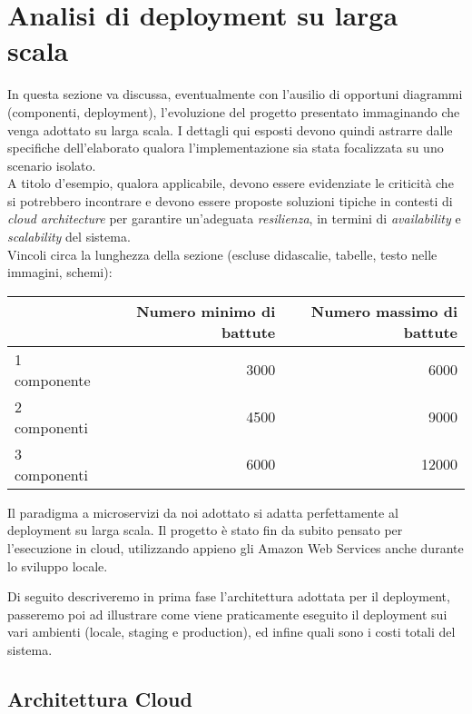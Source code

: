 
\section{Analisi di deployment su larga scala}

In questa sezione va discussa, eventualmente con l'ausilio di opportuni diagrammi (componenti, deployment), l'evoluzione del progetto presentato immaginando che venga adottato su larga scala. I dettagli qui esposti devono quindi astrarre dalle specifiche dell'elaborato qualora l'implementazione sia stata focalizzata su uno scenario isolato.\\

A titolo d’esempio, qualora applicabile, devono essere evidenziate le criticità che si potrebbero incontrare e devono essere proposte soluzioni tipiche in contesti di \textit{cloud architecture} per garantire un'adeguata \textit{resilienza}, in termini di \textit{availability} e \textit{scalability} del sistema.\\


Vincoli circa la lunghezza della sezione (escluse didascalie, tabelle, testo nelle immagini, schemi):

\vspace{1cm}
\begin{tabular}{l|rr}
 & Numero minimo di battute & Numero massimo di battute \\
 \hline
 1 componente & 3000 & 6000 \\
 2 componenti & 4500 & 9000 \\
 3 componenti & 6000 & 12000 \\
 \hline
\end{tabular}

Il paradigma a microservizi da noi adottato si adatta perfettamente al deployment su larga scala.
Il progetto è stato fin da subito pensato per l'esecuzione in cloud, utilizzando appieno gli Amazon Web Services anche durante lo sviluppo locale.

Di seguito descriveremo in prima fase l'architettura adottata per il deployment, 
passeremo poi ad illustrare come viene praticamente eseguito il deployment sui vari ambienti (locale, staging e production), 
ed infine quali sono i costi totali del sistema. 

\subsection{Architettura Cloud}

